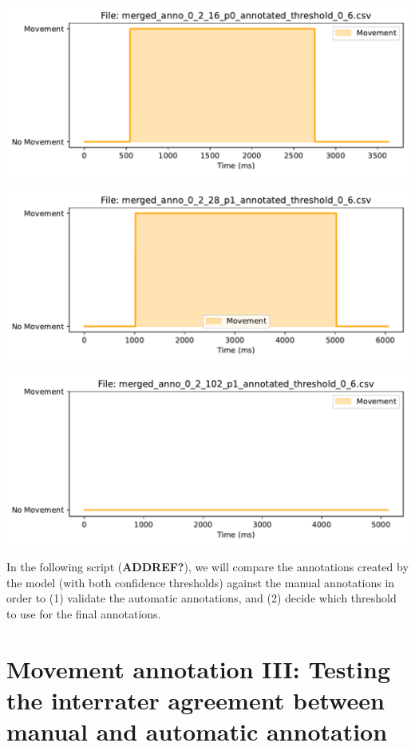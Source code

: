 \documentclass[
  letterpaper,
  DIV=11,
  numbers=noendperiod]{scrreprt}
\begin{document}
\includegraphics{04_TS_movementAnnotation/02_MovementClassifier_final_files/figure-pdf/cell-15-output-3.pdf}

\includegraphics{04_TS_movementAnnotation/02_MovementClassifier_final_files/figure-pdf/cell-15-output-4.pdf}

\includegraphics{04_TS_movementAnnotation/02_MovementClassifier_final_files/figure-pdf/cell-15-output-5.pdf}

In the following script (\textbf{ADDREF?}), we will compare the
annotations created by the model (with both confidence thresholds)
against the manual annotations in order to (1) validate the automatic
annotations, and (2) decide which threshold to use for the final
annotations.


\chapter{Movement annotation III: Testing the interrater agreement
between manual and automatic
annotation}\label{movement-annotation-iii-testing-the-interrater-agreement-between-manual-and-automatic-annotation}
\end{document}
